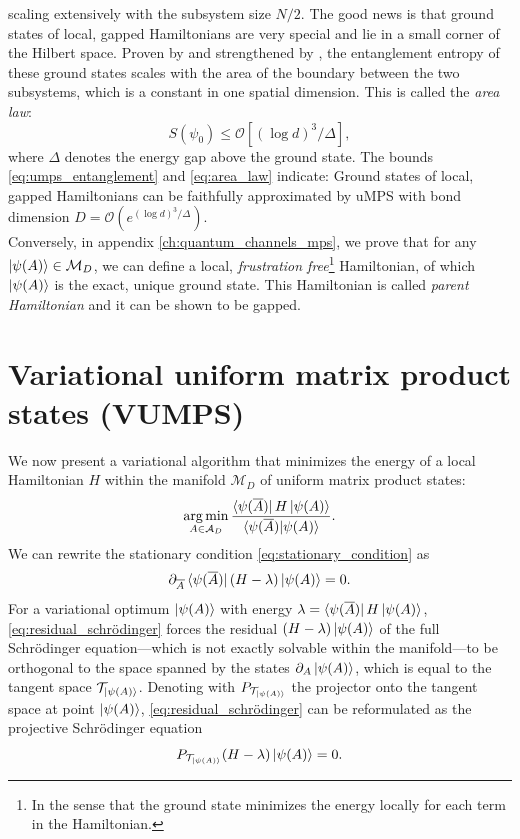 scaling extensively with the subsystem size $N/2$. The good news is that ground states of local, gapped Hamiltonians are very special and lie in a small corner of the Hilbert space. Proven by \cite{hastings2007area} and strengthened by \cite{arad2013area}, the entanglement entropy of these ground states scales with the area of the boundary between the two subsystems, which is a constant in one spatial dimension. This is called the \textit{area law}:
\begin{equation} \label{eq:area_law}
	S(\psi_0) \leq \mathcal{O}[(\log d)^3 / \Delta],
\end{equation}
where $\Delta$ denotes the energy gap above the ground state. The bounds \eqref{eq:umps_entanglement} and \eqref{eq:area_law} indicate: Ground states of local, gapped Hamiltonians can be faithfully approximated by uMPS with bond dimension $D = \mathcal{O}(e^{(\log d)^3 / \Delta})$. \\[0.5em]
\noindent Conversely, in appendix \ref{ch:quantum_channels_mps}, we prove that for any $\ket{\psi (A)} \in \mathcal{M}_D$, we can define a local, \textit{frustration free}\footnote{In the sense that the ground state minimizes the energy locally for each term in the Hamiltonian.} Hamiltonian, of which $\ket{\psi (A)}$ is the exact, unique ground state. This Hamiltonian is called \textit{parent Hamiltonian} and it can be shown to be gapped.


\section{Variational uniform matrix product states (VUMPS)} \label{sec:vumps}
\noindent We now present a variational algorithm \cite{zauner2018variational} that minimizes the energy of a local Hamiltonian $H$ within the manifold $\mathcal{M}_D$ of uniform matrix product states:
\begin{equation}
	\operatorname*{arg\,min}_{A \in \mathcal{A}_D} \frac{\bra{\psi(\overline{A})} H \ket{\psi(A)}}{\langle \psi(\overline{A}) \vert \psi(A) \rangle}.
\end{equation}
We can rewrite the stationary condition \eqref{eq:stationary_condition} as
\begin{equation} \label{eq:residual_schrödinger}
	\partial_{\overline{A}} \bra{\psi(\overline{A})} (H - \lambda) \ket{\psi(A)} = 0.
\end{equation}
For a variational optimum $\ket{\psi(A)}$ with energy $\lambda =  \bra{\psi(\overline{A})} H \ket{\psi(A)}$, \eqref{eq:residual_schrödinger} forces the residual $(H - \lambda) \ket{\psi(A)}$ of the full Schrödinger equation---which is not exactly solvable within the manifold---to be orthogonal to the space spanned by the states $\partial_A \ket{\psi(A)}$, which is equal to the tangent space $\mathcal{T}_{\ket{\psi (A)}}$. Denoting with $P_{\mathcal{T}_{\ket{\psi (A)}}}$ the projector onto the tangent space at point $\ket{\psi(A)}$, \eqref{eq:residual_schrödinger} can be reformulated as the projective Schrödinger equation
\begin{equation} \label{eq:projective_schrödinger}
	P_{\mathcal{T}_{\ket{\psi (A)}}} (H - \lambda) \ket{\psi(A)} = 0.
\end{equation}

